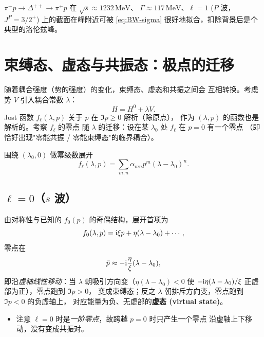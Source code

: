\begin{example}
  $\pi^+ p\to\Delta^{++}\to\pi^+ p$ 在 $\sqrt{s}\approx 1232\,\mathrm{MeV}$、
  $\Gamma\approx 117\,\mathrm{MeV}$、$\ell=1$ ($P$ 波，$J^P=3/2^+$)
  上的截面在峰附近可被 \eqref{eq:BW-sigma} 很好地拟合，扣除背景后是个
  典型的洛伦兹峰。
\end{example}

\section{束缚态、虚态与共振态：极点的迁移}

随着耦合强度（势的强度）的变化，束缚态、虚态和共振之间会
互相转换。考虑势 $V$ 引入耦合常数 $\lambda$：
\begin{equation}
  H=H^0+\lambda V .
\end{equation}
Jost 函数 $f_\ell(\lambda,p)$ 关于 $p$ 在 $\Im p\geq 0$ 解析（除原点），
作为 $(\lambda,p)$ 的函数也是解析的。考察 $f_\ell$ 的零点
随 $\lambda$ 的迁移：设在某 $\lambda_0$ 处 $f_\ell$ 在 $p=0$ 有一个零点
（即恰好出现"零能共振 / 零能束缚态"的临界耦合）。

围绕 $(\lambda_0,0)$ 做幂级数展开
\begin{equation}
  f_\ell(\lambda,p)=\sum_{m,n}\alpha_{mn}p^m(\lambda-\lambda_0)^n .
\end{equation}

\subsection{$\ell=0$（$s$ 波）}

由对称性与已知的 $f_0(p)$ 的奇偶结构，展开首项为
\begin{equation}
  f_0(\lambda,p)=\mathrm{i}\xi p+\eta(\lambda-\lambda_0)+\cdots ,
\end{equation}
零点在
\begin{equation}
  \bar p\approx -\mathrm{i}\frac{\eta}{\xi}(\lambda-\lambda_0),
\end{equation}
即沿\emph{虚轴线性移动}：当 $\lambda$ 朝吸引方向变（$\eta(\lambda-\lambda_0)<0$
使 $-\mathrm{i}\eta(\lambda-\lambda_0)/\xi$ 正虚部为正），零点跑到 $\Im p>0$，
变成束缚态；反之 $\lambda$ 朝排斥方向变，零点跑到 $\Im p<0$ 的负虚轴上，
对应能量为负、无虚部的\textbf{虚态 (virtual state)}。
\begin{itemize}
  \item 注意 $\ell=0$ 时是\emph{一阶零点}，故跨越 $p=0$ 时只产生一个零点
    沿虚轴上下移动，没有变成共振对。
\end{itemize}

